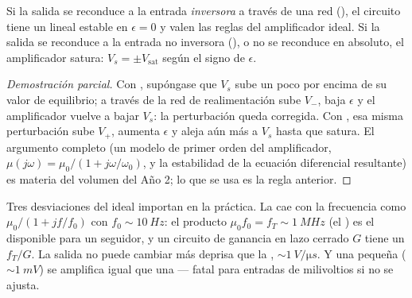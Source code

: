 \begin{proposition}\label{prop:b1:operational-amplifier:feedback}
Si la salida se reconduce a la entrada \emph{inversora} a través de una
red (), el circuito tiene un  lineal estable en $\epsilon = 0$ y valen las reglas del
amplificador ideal. Si la salida se reconduce a la entrada no inversora
(), o no se reconduce en absoluto, el amplificador
satura: $V_s = \pm V_{\mathrm{sat}}$ según el signo de $\epsilon$.
\end{proposition}

\begin{proof}[Demostración parcial]
Con , supóngase que $V_s$ sube un poco por encima
de su valor de equilibrio; a través de la red de realimentación sube
$V_-$, baja $\epsilon$ y el amplificador vuelve a bajar $V_s$: la
perturbación queda corregida. Con , esa misma
perturbación sube $V_+$, aumenta $\epsilon$ y aleja aún más a $V_s$ hasta
que satura. El argumento completo (un modelo de primer orden del
amplificador, $\mu(j\omega)
= \mu_0/(1 + j\omega/\omega_0)$, y la estabilidad de la ecuación
diferencial resultante) es materia del volumen del Año 2; lo que se usa es
la regla anterior.
\end{proof}

\begin{remark}\label{rem:b1:operational-amplifier:real}
Tres desviaciones del ideal importan en la práctica. La  cae con la frecuencia como $\mu_0/(1 + jf/f_0)$ con
$f_0 \sim \qty{10}{Hz}$: el producto $\mu_0 f_0 = f_T \sim \qty{1}{MHz}$
(el \emph{}) es el 
disponible para un seguidor, y un circuito de ganancia en lazo cerrado
$G$ tiene un  $f_T/G$. La salida no puede cambiar más
deprisa que la \emph{}, $\sim\qty{1}{V/\micro s}$.
Y una pequeña \emph{} ($\sim\qty{1}{mV}$) se amplifica igual que una  --- fatal
para entradas de milivoltios si no se ajusta.
\end{remark}

